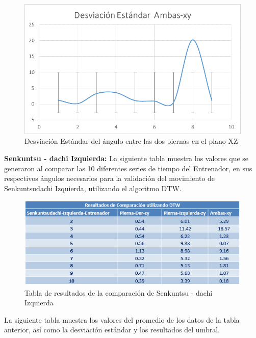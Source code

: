 \begin{figure}[H]%
	\begin{center}
		\includegraphics[scale=0.70]{./Figuras/Implementacion/Senkuntsudachi_Derecha_DesvEst_Ambas_xy}
	\end{center}
	\caption{Desviación Estándar del ángulo entre las dos piernas en el plano XZ}
	\label{fig:Senkuntsudachi_Derecha_DesvEst_Ambas_xy}
\end{figure}
\textbf{Senkuntsu - dachi Izquierda:}
La siguiente tabla muestra los valores que se generaron al comparar las 10 diferentes series de tiempo del Entrenador, en sus respectivos ángulos necesarios para la validación del movimiento de Senkuntsudachi Izquierda, utilizando el algoritmo DTW.
\begin{figure}[H]%
	\begin{center}
		\includegraphics[scale=1]{./Figuras/Implementacion/Senkuntsudachi_Izquierda_TablaDTW}
	\end{center}
	\caption{Tabla de resultados de la comparación de Senkuntsu - dachi Izquierda}
	\label{fig:Senkuntsudachi_Izquierda_TablaDTW}
\end{figure}
La siguiente tabla muestra los valores del promedio de los datos de la tabla anterior, así como la desviación estándar y los resultados del umbral.
